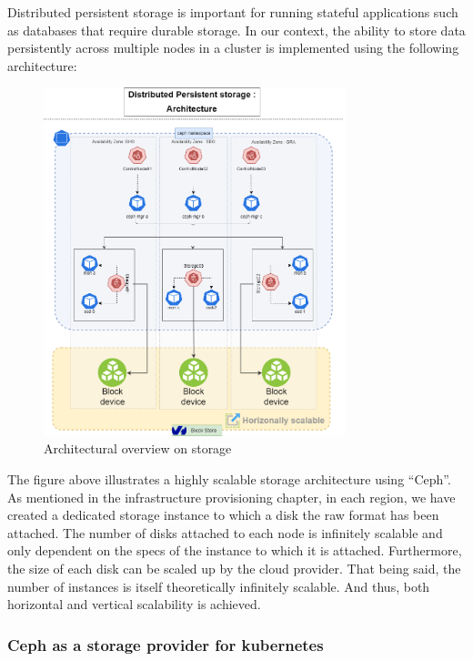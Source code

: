 Distributed persistent storage is important for running stateful applications such as databases that require durable storage. In our context, the ability to store data persistently across multiple nodes in a cluster is implemented using the following architecture: 

\begin{figure}[H]\centering
\includegraphics[width=0.78\textwidth,angle=00]{assets/f26.png}
\caption{Architectural overview on storage}
\label{fig:Architectural overview on storage}
\end{figure}

The figure above illustrates a highly scalable storage architecture using “Ceph”. As mentioned in the infrastructure provisioning chapter, in each region, we have created a dedicated storage instance to which a disk the raw format has been attached. The number of disks attached to each node is infinitely scalable and only dependent on the specs of the instance to which it is attached. Furthermore, the size of each disk can be scaled up by the cloud provider. That being said, the number of instances is itself theoretically infinitely scalable. And thus, both horizontal and vertical scalability is achieved. 

\subsubsection{Ceph as a storage provider for kubernetes }

